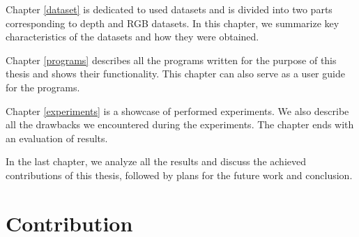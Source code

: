 Chapter \ref{dataset} is dedicated to used datasets and is divided into two parts corresponding to depth and RGB datasets. In this chapter, we summarize key characteristics of the datasets and how they were obtained.

Chapter \ref{programs} describes all the programs written for the purpose of this thesis and shows their functionality. This chapter can also serve as a user guide for the programs.

Chapter \ref{experiments} is a showcase of performed experiments. We also describe all the drawbacks we encountered during the experiments. The chapter ends with an evaluation of results.

In the last chapter, we analyze all the results and discuss the achieved contributions of this thesis, followed by plans for the future work and conclusion.

\section{Contribution}
